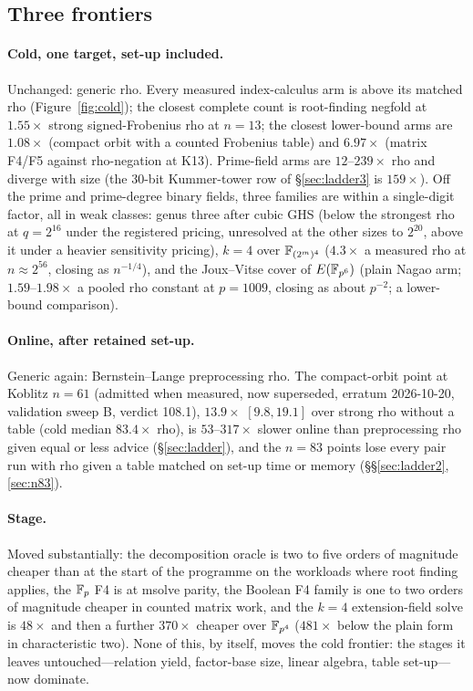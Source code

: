 \subsection{Three frontiers}

\paragraph{Cold, one target, set-up included.} Unchanged: generic rho.
Every measured index-calculus arm is above its matched rho
(Figure~\ref{fig:cold}); the closest complete count is root-finding negfold
at $1.55\times$ strong signed-Frobenius rho at $n=13$; the closest
lower-bound arms are $1.08\times$ (compact orbit with a counted Frobenius
table) and $6.97\times$ (matrix F4/F5 against rho-negation at K13).
Prime-field arms are $12$--$239\times$ rho and diverge with size (the
30-bit Kummer-tower row of \S\ref{sec:ladder3} is $159\times$). Off the
prime and prime-degree binary fields, three families are within a
single-digit factor, all in weak classes: genus three after cubic GHS
(below the strongest rho at $q=2^{16}$ under the registered pricing,
unresolved at the other sizes to $2^{20}$, above it under a heavier
sensitivity pricing), $k=4$ over $\mathbb{F}_{(2^m)^4}$
($4.3\times$ a measured rho at $n\approx2^{56}$, closing as $n^{-1/4}$), and
the Joux--Vitse cover of $E(\mathbb{F}_{p^6})$ (plain Nagao arm; $1.59$--$1.98\times$ a pooled rho
constant at $p=1009$, closing as about $p^{-2}$; a lower-bound comparison).

\paragraph{Online, after retained set-up.} Generic again: Bernstein--Lange
preprocessing rho. The compact-orbit point at Koblitz $n=61$ (admitted when measured, now
superseded, erratum 2026-10-20, validation sweep B, verdict 108.1),
$13.9\times$ $[9.8,19.1]$ over strong rho without a table (cold median
$83.4\times$ rho), is $53$--$317\times$ slower online than preprocessing rho
given equal or less advice (\S\ref{sec:ladder}), and the $n=83$ points
lose every pair run with rho given a table matched on set-up time or
memory (\S\S\ref{sec:ladder2},\ref{sec:n83}).

\paragraph{Stage.} Moved substantially: the decomposition oracle is two to
five orders of magnitude cheaper than at the start of the programme on the
workloads where root finding applies, the $\mathbb{F}_p$ F4 is at msolve parity,
the Boolean F4 family is one to two orders of magnitude cheaper in counted
matrix work, and the $k=4$ extension-field solve is $48\times$ and then a
further $370\times$ cheaper over $\mathbb{F}_{p^4}$ ($481\times$ below the plain
form in characteristic two).
None of this, by itself, moves the cold frontier: the stages it leaves
untouched---relation yield, factor-base size, linear algebra, table
set-up---now dominate.

